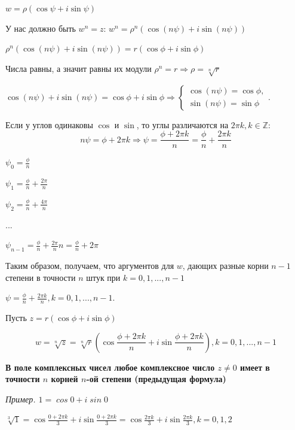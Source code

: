 \documentclass[a4paper]{article}
\begin{document}
$w = \rho (\cos \psi + i \sin \psi)$

У нас должно быть $w^n = z$: $w^n = \rho^n (\cos (n \psi) + i \sin (n \psi))$

$\rho^n (\cos (n \psi) + i \sin (n \psi)) = r (\cos  \phi + i \sin \phi)$

Числа равны, а значит равны их модули $\rho^n = r \Rightarrow \rho = \sqrt[n]{r}$

$\cos (n \psi) + i \sin (n \psi) = \cos  \phi + i \sin \phi \Rightarrow \begin{cases}
\cos (n \psi) = \cos \phi,
\\
\sin (n \psi) = \sin \phi
\end{cases}$.

Если у углов одинаковы $\cos$ и $\sin$, то углы различаются на $2\pi k, k \in \mathbb{Z}$:
\begin{equation}
n \psi = \phi + 2\pi k \Rightarrow \psi = \frac{\phi + 2 \pi k}{n} = \frac{\phi}{n} + \frac{2 \pi k}{n}
\end{equation}

$\displaystyle \psi_0 = \frac{\phi}{n}$

$\displaystyle \psi_1 = \frac{\phi}{n} + \frac{2\pi}{n}$

$\displaystyle \psi_2 = \frac{\phi}{n} + \frac{4\pi}{n}$

...

$\displaystyle \psi_{n-1} = \frac{\phi}{n} + \frac{2\pi}{n}n = \frac{\phi}{n} + 2\pi$

Таким образом, получаем, что аргументов для $w$, дающих разные корни $n-1$ степени в точности $n$ штук при $k =0, 1, ..., n-1$

$\psi = \frac{\phi}{n} + \frac{2\pi k}{n}, k = 0, 1, ..., n-1$.


Пусть $z = r(\cos \phi + i \sin \phi)$

\begin{equation}
\displaystyle w = \sqrt[n]{z} = \sqrt[n]{r} \left( \cos \frac{\phi + 2\pi k}{n} + i \sin \frac{\phi + 2\pi k}{n} \right), k = 0,1,...,n-1
\end{equation}

\textbf{В поле комплексных чисел любое комплексное число $z \neq 0$ имеет в точности $n$ корней $n$-ой степени (предыдущая формула)}

\textit{Пример. $\mathit{1 = \cos 0 + i \sin 0}$}

$\displaystyle \sqrt[3]{1} = \cos \frac{0+2\pi k}{3} + i \sin \frac{0 + 2\pi k}{3} = \cos \frac{2 \pi k}{3} + i \sin \frac{2 \pi k}{3}, k = 0,1,2$
\end{document}
